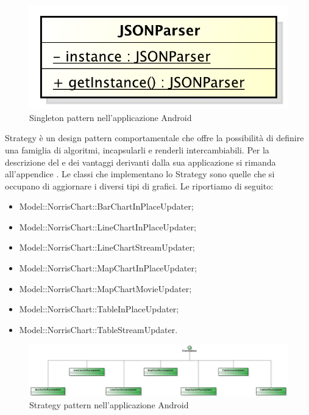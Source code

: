 	    			\begin{figure}[H]\centering
	        			\includegraphics[width=\textwidth]{SpecificaTecnica/Pics/DesignPatternApp/Singleton3}
	        			\caption{Singleton pattern nell'applicazione Android}
	    			\end{figure}
			Strategy è un design pattern comportamentale che offre la possibilità di definire una famiglia di
algoritmi, incapsularli e renderli intercambiabili. Per la descrizione del  e dei vantaggi derivanti dalla sua applicazione si rimanda all'appendice .
					Le classi che implementano lo Strategy sono quelle che si occupano di aggiornare i diversi tipi di grafici. Le riportiamo di seguito:
					\begin{itemize}
					\item Model::NorrisChart::BarChartInPlaceUpdater;
					\item Model::NorrisChart::LineChartInPlaceUpdater;
					\item Model::NorrisChart::LineChartStreamUpdater;
					\item Model::NorrisChart::MapChartInPlaceUpdater;
					\item Model::NorrisChart::MapChartMovieUpdater;
					\item Model::NorrisChart::TableInPlaceUpdater;
					\item Model::NorrisChart::TableStreamUpdater.
				\end{itemize}
				\begin{figure}[H]\centering
	        		\includegraphics[width=\textwidth]{SpecificaTecnica/Pics/DesignPatternNorris/Strategy}
	        		\caption{Strategy pattern nell'applicazione Android}
	    		\end{figure}

